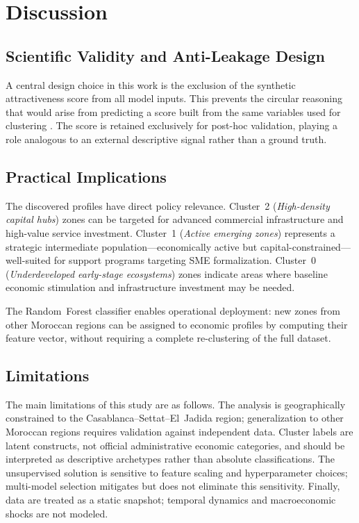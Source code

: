 \documentclass[conference]{IEEEtran}
\begin{document}
\section{Discussion}
\label{sec:discussion}

\subsection{Scientific Validity and Anti-Leakage Design}

A central design choice in this work is the exclusion of the
synthetic attractiveness score from all model inputs. This prevents
the circular reasoning that would arise from predicting a score
built from the same variables used for clustering
\cite{feldmeyer2020using,sakti2024machine}. The score is retained
exclusively for post-hoc validation, playing a role analogous to
an external descriptive signal rather than a ground truth.

\subsection{Practical Implications}

The discovered profiles have direct policy relevance.
Cluster~2 (\textit{High-density capital hubs}) zones can be targeted
for advanced commercial infrastructure and high-value service investment.
Cluster~1 (\textit{Active emerging zones}) represents a strategic
intermediate population---economically active but capital-constrained---
well-suited for support programs targeting SME formalization.
Cluster~0 (\textit{Underdeveloped early-stage ecosystems}) zones indicate
areas where baseline economic stimulation and infrastructure
investment may be needed.

The Random~Forest classifier enables operational deployment:
new zones from other Moroccan regions can be assigned to economic
profiles by computing their feature vector, without requiring
a complete re-clustering of the full dataset.

\subsection{Limitations}

The main limitations of this study are as follows.
The analysis is geographically constrained to the
Casablanca--Settat--El~Jadida region; generalization to other
Moroccan regions requires validation against independent data.
Cluster labels are latent constructs, not official administrative
economic categories, and should be interpreted as descriptive
archetypes rather than absolute classifications.
The unsupervised solution is sensitive to feature scaling and
hyperparameter choices; multi-model selection mitigates but does
not eliminate this sensitivity.
Finally, data are treated as a static snapshot; temporal dynamics
and macroeconomic shocks are not modeled.
\end{document}

